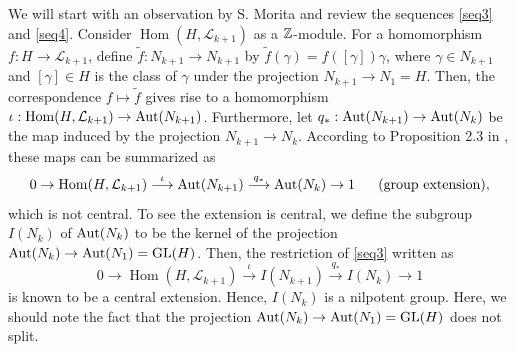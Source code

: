 \documentclass{article}
\theoremstyle{plain}
\theoremstyle{definition}
\def\Hom{\mathop{\mathrm{Hom}}\nolimits}
\newcommand{\lra}{\longrightarrow}
\newcommand{\ra}{\rightarrow}
\newcommand{\Z}{{\Bbb Z}}
\newcommand{\Aut}{{\rm Aut}}
\newcommand{\GL}{{\rm GL}}
\begin{document}
{We will start with an observation by S. Morita \cite[\S 2]{Mo} and review the sequences \eqref{seq3} and \eqref{seq4}. Consider $\Hom ( H , \mathcal{L}_{k+1} )$ as a $\Z$-module. For a homomorphism $f : H \ra \mathcal{L}_{k+1}$, define $\tilde{f}: N_{k+1} \ra N_{k+1} $ by $\tilde{f} (\gamma )=f([ \gamma]) \gamma $, where $\gamma \in N_{k+1}$ and $[ \gamma] \in H $ is the class of $\gamma $ under the projection $N_{k+1} \ra N_{1} =H$. Then, the correspondence $ f \mapsto \tilde{f}$ gives rise to a homomorphism $\iota : \Hom ( H , \mathcal{L}_{k+1}) \ra \Aut(N_{k+1}) $. Furthermore, let $q_* : \Aut(N_{k+1}) \ra \Aut(N_{k}) $ be the map induced by the projection $ N_{k+1} \ra N_k$. According to Proposition 2.3 in \cite{Mo}, these maps can be summarized as
\begin{equation}\label{seq3}
0 \ra \Hom ( H , \mathcal{L}_{k+1}) \stackrel{\iota }{\lra } \Aut(N_{k+1})
\stackrel{q_* }{\lra } \Aut(N_{k}) \ra 1 \ \ \ \ \ (\mathrm{group \ extension}),
\end{equation}
which is not central. To see the extension is central, we define the subgroup $I(N_k)$ of $\Aut(N_k)$ to be the kernel of the projection $\Aut(N_k) \ra \Aut(N_1) =\GL(H)$. Then, the restriction of \eqref{seq3} written as
\begin{equation}\label{seq4}
0 \ra \Hom ( H , \mathcal{L}_{k+1}) \stackrel{\iota }{\lra } I(N_{k+1}) \stackrel{q_* }{\lra } I(N_k)\ra 1
\end{equation}
is known to be a central extension. Hence, $I ( N_k )$ is a nilpotent group. Here, we should note the fact that the projection $\Aut(N_k) \ra \Aut(N_1) =\GL(H)$ does not split.

}
\end{document}
